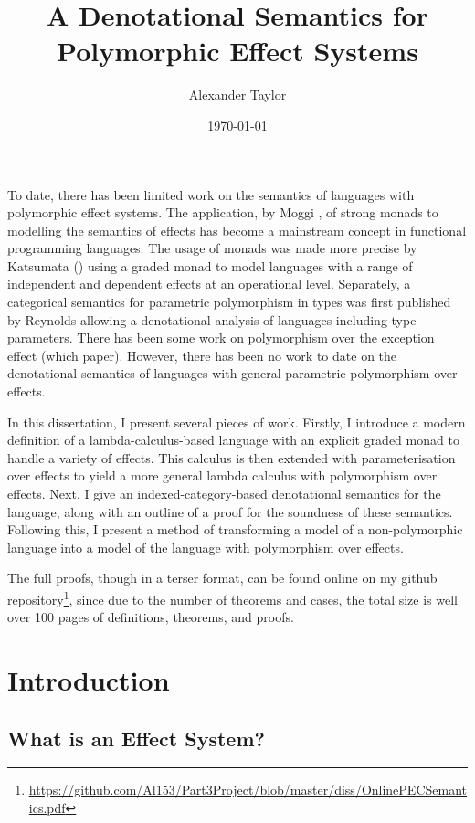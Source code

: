 \documentclass{Report}
\title{A Denotational Semantics for Polymorphic Effect Systems}
\date{\today}
\author{Alexander Taylor}
\begin{document}
\maketitle

\newcommand{\note}[1]{
}

\abstract
To date, there has been limited work on the semantics of languages with polymorphic effect systems. The application, by Moggi \cite{MoggiMonads}, of strong monads to modelling the semantics of effects has become a mainstream concept in functional programming languages. The usage of monads was made more precise by Katsumata (\cite{Katsumata:2014}) using a graded monad to model languages with a range of independent and dependent effects at an operational level. Separately, a categorical semantics for parametric polymorphism in types was first published by Reynolds \cite{PLCSemantics} allowing a denotational analysis of languages including type parameters. There has been some work on polymorphism over the exception effect (which paper). However, there has been no work to date on the denotational semantics of languages with general parametric polymorphism over effects.

In this dissertation, I present several pieces of work. Firstly, I introduce a modern definition of a lambda-calculus-based language with an explicit graded monad to handle a variety of effects. This calculus is then extended with parameterisation over effects to yield a more general lambda calculus with polymorphism over effects. Next, I give an indexed-category-based denotational semantics for the language, along with an outline of a proof for the soundness of these semantics. Following this, I present a method of transforming a model of a non-polymorphic language into a model of the language with polymorphism over effects.

The full proofs, though in a terser format, can be found online on my github repository\footnote{\url{https://github.com/Al153/Part3Project/blob/master/diss/OnlinePECSemantics.pdf}}, since due to the number of theorems and cases, the total size is well over 100 pages of definitions, theorems, and proofs.

\tableofcontents

\chapter{Introduction}


\section{What is an Effect System?}
\end{document}

